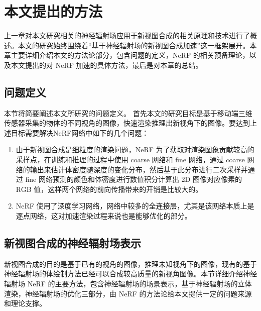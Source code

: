 
\chapter{本文提出的方法}\label{citations}
上一章对本文研究相关的神经辐射场应用于新视图合成的相关原理和技术进行了概述。本文的研究始终围绕着“基于神经辐射场的新视图合成加速”这一框架展开。本章主要详细介绍本文的方法论部分，包含问题的定义，NeRF 的相关预备理论，以及本文提出的对 NeRF 加速的具体方法，最后是对本章的总结。

\section{问题定义}
本节将简要阐述本文所研究的问题定义。
首先本文的研究目标是基于移动端三维传感器采集的物体的不同视角的图像，快速渲染推理出新视角下的图像。要达到上述目标需要解决NeRF网络中如下的几个问题：
\begin{enumerate}
    \item 由于新视图合成是细粒度的渲染问题，NeRF 为了获取对渲染图象贡献较高的采样点，在训练和推理的过程中使用 coarse 网络和 fine 网络，通过 coarse 网络的输出来估计体密度随深度的变化分布，然后基于此分布进行二次采样并通过 fine 网络预测的颜色和体密度进行数值积分计算出 2D 图像对应像素的 RGB 值，这样两个网络的前向传播带来的开销是比较大的。
    \item NeRF 使用了深度学习网络，网络中较多的全连接层，尤其是该网络本质上是逐点网络，这对加速渲染过程来说也是能够优化的部分。
\end{enumerate}

\section{新视图合成的神经辐射场表示}
新视图合成的目的是基于已有的视角的图像，推理未知视角下的图像，现有的基于神经辐射场的体绘制方法已经可以合成较高质量的新视角图像。本节详细介绍神经辐射场 NeRF 的主要方法，包含神经辐射场的场景表示，基于神经辐射场的立体渲染，神经辐射场的优化三部分，由 NeRF 的方法论给本文提供一定的问题来源和理论支撑。

